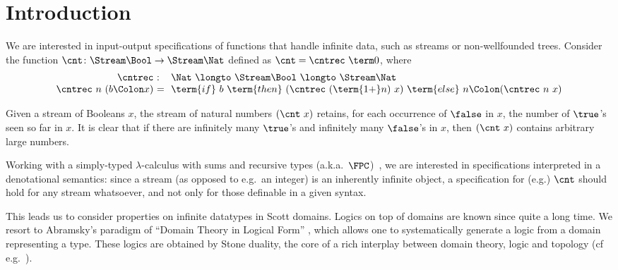 \section{Introduction}
\label{sec:intro}

We are interested in input-output
specifications of functions that handle infinite 
data, such as streams or non-wellfounded trees.
Consider the function $\cnt \colon \Stream \Bool \to \Stream \Nat$
defined as $\cnt = \cntrec\ \term 0$,
where
\[
\begin{array}{r @{~} l @{~~} l}
  \cntrec
& :
& \Nat
  ~\longto~
  \Stream \Bool
  ~\longto~
  \Stream \Nat
\\
%
  \cntrec\ n\ (b \Colon x)
& =
& \term{if}~ b 
  ~\term{then}~ (\cntrec\ (\term{1+}n)\ x)
  ~\term{else}~ n \Colon (\cntrec\ n\ x)
\end{array}
\]

\noindent
Given a stream of Booleans $x$, the stream of natural
numbers $(\cnt\ x)$ retains,
for each occurrence of $\false$ in $x$,
the number of $\true$'s seen so far in $x$.
It is clear that
if there are infinitely many $\true$'s and infinitely many $\false$'s in $x$,
then $(\cnt\ x)$ contains arbitrary large numbers.

Working with a simply-typed $\lambda$-calculus with sums and recursive types
(a.k.a.\ $\FPC$)~\cite{pierce02book},
we are interested in specifications 
interpreted in a denotational semantics:
since a stream (as opposed to e.g.\ an integer)
is an inherently infinite object, a specification for (e.g.) $\cnt$
should hold for any stream whatsoever, and not only
for those definable in a given syntax.

This leads us to consider properties on infinite datatypes in Scott domains.
%
Logics on top of domains are known since quite a long time.
%
%
We resort to Abramsky's paradigm of
``Domain Theory in Logical Form'' \cite{abramsky87lics,abramsky91apal},
which allows one to systematically generate a logic from a 
domain representing a type.
These logics are obtained by Stone duality,
the core of a
rich interplay between domain theory, logic and topology
(cf e.g.~\cite{johnstone82book,vickers89book,zhang91book,ac98book,cz00csl,vickers07chapter,goubault13book,gg24book}).


